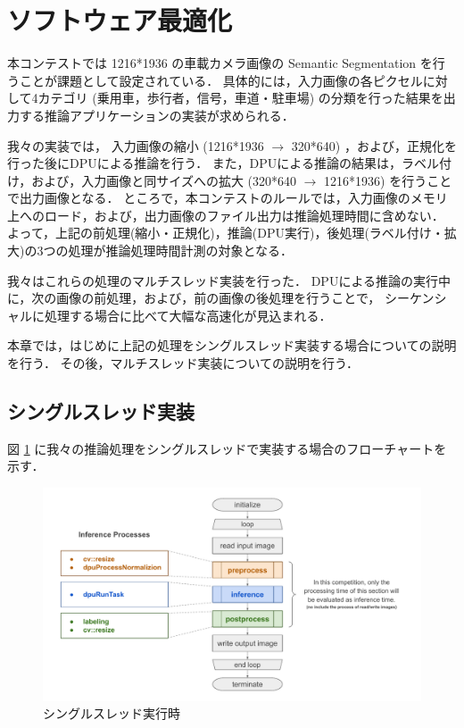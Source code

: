 \section{ソフトウェア最適化}
本コンテストでは 1216*1936 の車載カメラ画像の Semantic Segmentation を行うことが課題として設定されている．
具体的には，入力画像の各ピクセルに対して4カテゴリ (乗用車，歩行者，信号，車道・駐車場)
の分類を行った結果を出力する推論アプリケーションの実装が求められる．

我々の実装では，
入力画像の縮小 (1216*1936 $\rightarrow$ 320*640) ，および，正規化を行った後にDPUによる推論を行う．
また，DPUによる推論の結果は，ラベル付け，および，入力画像と同サイズへの拡大 (320*640 $\rightarrow$ 1216*1936) を行うことで出力画像となる．
ところで，本コンテストのルールでは，入力画像のメモリ上へのロード，および，出力画像のファイル出力は推論処理時間に含めない．
よって，上記の前処理(縮小・正規化)，推論(DPU実行)，後処理(ラベル付け・拡大)の3つの処理が推論処理時間計測の対象となる．

我々はこれらの処理のマルチスレッド実装を行った．
DPUによる推論の実行中に，次の画像の前処理，および，前の画像の後処理を行うことで，
シーケンシャルに処理する場合に比べて大幅な高速化が見込まれる．

本章では，はじめに上記の処理をシングルスレッド実装する場合についての説明を行う．
その後，マルチスレッド実装についての説明を行う．

\subsection{シングルスレッド実装}
図 \ref{fig:singlethread} に我々の推論処理をシングルスレッドで実装する場合のフローチャートを示す．

\begin{figure}[h]
  \begin{center}
    \includegraphics[width=\linewidth]{figures/sw_opt_flowchart_singlethread.pdf}
    \caption{シングルスレッド実行時}
    \label{fig:singlethread}
  \end{center}
\end{figure}

